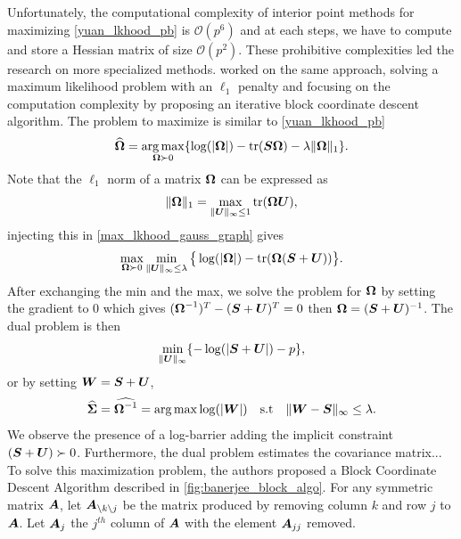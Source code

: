 Unfortunately, the computational complexity of interior point methods for maximizing \cref{yuan_lkhood_pb} is $\mathcal O (p^6)$ and at each steps, we have to compute and store a Hessian matrix of size $\mathcal O (p^2)$. These prohibitive complexities led the research on more specialized methods. \citep{banerjee} worked on the same approach, solving a maximum likelihood problem with an $\ell_1$ penalty and focusing on the computation complexity by proposing an iterative block coordinate descent algorithm. The problem to maximize is similar to \cref{yuan_lkhood_pb}
\begin{equation}
\label{max_lkhood_gauss_graph}
  \widehat{\boldsymbol\Omega} = \operatorname*{arg\,max}_{\boldsymbol\Omega \succ 0}\{\log(|\boldsymbol\Omega|)-\textnormal{tr}(\boldsymbol S\boldsymbol\Omega)-\lambda\|\boldsymbol\Omega \|_1\}.
\end{equation}
Note that the $\ell_1$ norm of a matrix $\boldsymbol\Omega$ can be expressed as
\begin{equation}
  \|\boldsymbol\Omega \|_1 = \max_{\| \boldsymbol U\|_{\infty}\leq 1}\textnormal{tr}(\boldsymbol\Omega\boldsymbol U),
\end{equation}
injecting this in \cref{max_lkhood_gauss_graph} gives
\begin{equation}
  \max_{\boldsymbol\Omega \succ 0} \min_{\|\boldsymbol U\|_{\infty}\leq \lambda} \big\{\log(|\boldsymbol\Omega|)-\textnormal{tr}(\boldsymbol\Omega(\boldsymbol S+\boldsymbol U))\big\}.
\end{equation}
After exchanging the min and the max, we solve the problem for $\boldsymbol\Omega$ by setting the gradient to $0$ which gives $(\boldsymbol\Omega^{-1})^T-(\boldsymbol S+\boldsymbol U)^T=0$ then $\boldsymbol\Omega = (\boldsymbol S+\boldsymbol U)^{-1}$. The dual problem is then
\begin{equation}
  \min_{\|\boldsymbol U \|_{\infty}}\{-\log(|\boldsymbol S+\boldsymbol U|) -p\},
\end{equation}
or by setting $\boldsymbol W = \boldsymbol S+\boldsymbol U$,
\begin{equation}
\label{banerjee_min_pb}
  \widehat{\boldsymbol\Sigma} = \widehat{\boldsymbol\Omega^{-1}}= \operatorname*{arg\,max} \log(|\boldsymbol W|) \quad \textnormal{s.t}\quad \|\boldsymbol W-\boldsymbol S \|_{\infty} \leq \lambda.
\end{equation}
We observe the presence of a log-barrier adding the implicit constraint $(\boldsymbol S+\boldsymbol U) \succ 0$. Furthermore, the dual problem estimates the covariance matrix... To solve this maximization problem, the authors proposed a Block Coordinate Descent Algorithm described in \cref{fig:banerjee_block_algo}. For any symmetric matrix $\boldsymbol A$, let $\boldsymbol A_{\setminus k \setminus j}$ be the matrix produced by removing column $k$ and row $j$ to $\boldsymbol A$. Let $\boldsymbol A_j$ the $j^{th}$ column of $\boldsymbol A$ with the element $\boldsymbol A_{jj}$ removed.
